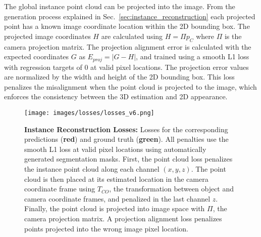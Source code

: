 \documentclass[10pt,twocolumn,letterpaper]{article}
\begin{document}
	The global instance point cloud can be projected into the image. From the generation process explained in Sec.~\ref{sec:instance_reconstruction} each projected point has a known image coordinate location within the 2D bounding box. The projected image coordinates $H$ are calculated using $H=\Pi p_{C}$ where $\Pi$ is the camera projection matrix. The projection alignment error is calculated with the expected coordinates $G$ as $E_{proj}=|G-H|$, and trained using a smooth L1 loss with regression targets of 0 at valid pixel locations. The projection error values are normalized by the width and height of the 2D bounding box. This loss penalizes the misalignment when the point cloud is projected to the image, which enforces the consistency between the 3D estimation and 2D appearance.
	
	\begin{figure}[t!]
		\begin{center}
			\texttt{[image: images/losses/losses\_v6.png]}
		\end{center}
		\caption{\textbf{Instance Reconstruction Losses:} Losses for the corresponding predictions (\textbf{red}) and ground truth (\textbf{green}). All penalties use the smooth L1 loss at valid pixel locations using automatically generated segmentation masks. First, the point cloud loss penalizes the instance point cloud along each channel $(x,y,z)$. The point cloud is then placed at its estimated location in the camera coordinate frame using $T_{CO}$, the transformation between object and camera coordinate frames, and penalized in the last channel $z$. Finally, the point cloud is projected into image space with $\Pi$, the camera projection matrix. A projection alignment loss penalizes points projected into the wrong image pixel location.}
		\label{fig:hybrid_losses}
	\end{figure}
	
\end{document}
